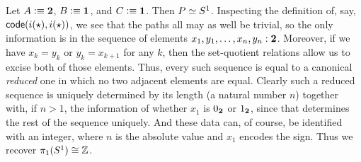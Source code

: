 \documentclass[hott-all.tex]{subfiles}
\begin{document}
%
% 
% 
% 
\begin{eg}
  Let $A\vcentcolon\equiv \mathbf{2}$, $B\vcentcolon\equiv\mathbf{1}$, and $C\vcentcolon\equiv \mathbf{1}$.
  Then $P \simeq S^1$.
  Inspecting the definition of, say, $\mathsf{code}(i(\star),i(\star))$, we see that the paths all may as well be trivial, so the only information is in the sequence of elements $x_1,y_1,\dots,x_n,y_n: \mathbf{2}$.
  Moreover, if we have $x_k=y_k$ or $y_k=x_{k+1}$ for any $k$, then the set-quotient relations allow us to excise both of those elements.
  Thus, every such sequence is equal to a canonical \emph{reduced} one in which no two adjacent elements are equal.
  Clearly such a reduced sequence is uniquely determined by its length (a natural number $n$) together with, if $n>1$, the information of whether $x_1$ is ${0_{\mathbf{2}}}$ or ${1_{\mathbf{2}}}$, since that determines the rest of the sequence uniquely.
  And these data can, of course, be identified with an integer, where $n$ is the absolute value and $x_1$ encodes the sign.
  Thus we recover $\pi_1(S^1)\cong \mathbb{Z}$.
\end{eg}
% 
\end{document}
